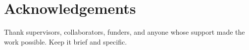 \chapter*{Acknowledgements}

Thank supervisors, collaborators, funders, and anyone whose support made
the work possible. Keep it brief and specific.

